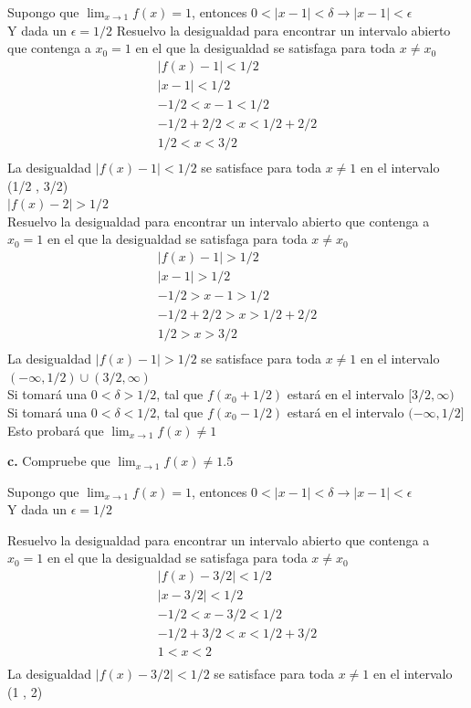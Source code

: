 \documentclass[12pt, letterpaper]{article}
\begin{document}
Supongo que $\lim_{x \to 1} f(x) = 1$, entonces $0 < | x - 1| < \delta \rightarrow | x - 1 | <\epsilon$\\

Y dada un $\epsilon = 1/2$
Resuelvo la desigualdad para encontrar un intervalo abierto que contenga a $x_0 = 1$ en el que la desigualdad se satisfaga para toda $x \neq x_0$
\begin{align*}
	| f(x) - 1 |< 1/2 \\
	| x - 1 |< 1/2\\
	- 1/2 <  x - 1 < 1/2\\
	- 1/2 + 2/2 <  x  < 1/2 + 2/2\\
	 1/2 <  x  < 3/2\\
\end{align*}
La desigualdad 	$| f(x) - 1 |< 1/2$ se satisface para toda $x\neq 1$ en el intervalo (1/2 , 3/2)\\

$| f(x) - 2 | > 1/2$\\
Resuelvo la desigualdad para encontrar un intervalo abierto que contenga a $x_0 = 1$ en el que la desigualdad se satisfaga para toda $x \neq x_0$
\begin{align*}
	| f(x) - 1 | > 1/2 \\
	| x - 1 | > 1/2\\
	- 1/2 >  x - 1 > 1/2\\
	- 1/2 + 2/2  >  x  > 1/2 + 2/2\\
	 1/2  >  x  > 3/2\\
\end{align*}
La desigualdad 	$| f(x) - 1 | > 1/2$ se satisface para toda $x\neq 1$ en el intervalo $(-\infty, 1/2) \cup (3/2, \infty)$\\

Si tomará una $0< \delta > 1/2$, tal que $f(x_0+1/2)$ estará en el intervalo $[3/2, \infty)$
Si tomará una $0 < \delta < 1/2$, tal que $f(x_0 - 1/2)$ estará en el intervalo $(-\infty, 1/2]$
Esto probará que $\lim_{x \to 1} f(x) \neq 1$

\textbf{c.} Compruebe que $\lim_{x \to 1} f(x) \neq 1.5$

Supongo que $\lim_{x \to 1} f(x) = 1$, entonces $0 < | x - 1| < \delta \rightarrow | x - 1 | <\epsilon$\\
Y dada un $\epsilon = 1/2$

Resuelvo la desigualdad para encontrar un intervalo abierto que contenga a $x_0 = 1$ en el que la desigualdad se satisfaga para toda $x \neq x_0$
\begin{align*}
	| f(x) - 3/2 | < 1/2 \\
	| x - 3/2 |< 1/2\\
	- 1/2 <  x - 3/2 < 1/2\\
	- 1/2 + 3/2 <  x  < 1/2 + 3/2\\
	   1 <  x  < 2\\
\end{align*}
La desigualdad $| f(x) - 3/2 |< 1/2$ se satisface para toda $x\neq 1$ en el intervalo (1 , 2)\\
\end{document}
